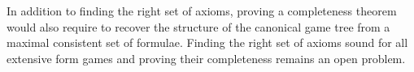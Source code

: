 \documentclass[letterpaper]{article}
\begin{document}
In addition to finding the right set of axioms, proving a completeness theorem would also require to recover the structure of the canonical game tree from a maximal consistent set of formulae. Finding the right set of axioms sound for all extensive form games and proving their completeness remains an open problem.




\end{document}
